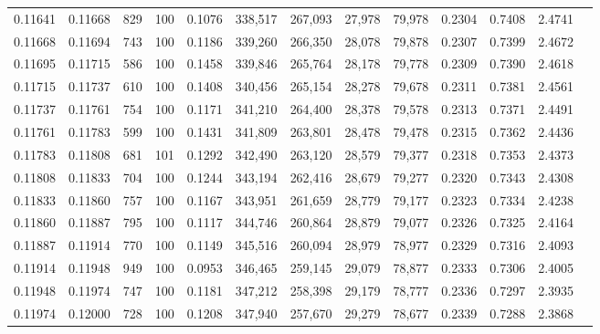 \begin{tabular}{rrrrrrrrrrrrr}
0.11641 & 0.11668 &   829 & 100 &                                     0.1076 & 338,517 & 267,093 &  27,978 &  79,978 & 0.2304 & 0.7408 & 2.4741 \\
0.11668 & 0.11694 &   743 & 100 &                                     0.1186 & 339,260 & 266,350 &  28,078 &  79,878 & 0.2307 & 0.7399 & 2.4672 \\
0.11695 & 0.11715 &   586 & 100 &                                     0.1458 & 339,846 & 265,764 &  28,178 &  79,778 & 0.2309 & 0.7390 & 2.4618 \\
0.11715 & 0.11737 &   610 & 100 &                                     0.1408 & 340,456 & 265,154 &  28,278 &  79,678 & 0.2311 & 0.7381 & 2.4561 \\
0.11737 & 0.11761 &   754 & 100 &                                     0.1171 & 341,210 & 264,400 &  28,378 &  79,578 & 0.2313 & 0.7371 & 2.4491 \\
0.11761 & 0.11783 &   599 & 100 &                                     0.1431 & 341,809 & 263,801 &  28,478 &  79,478 & 0.2315 & 0.7362 & 2.4436 \\
0.11783 & 0.11808 &   681 & 101 &                                     0.1292 & 342,490 & 263,120 &  28,579 &  79,377 & 0.2318 & 0.7353 & 2.4373 \\
0.11808 & 0.11833 &   704 & 100 &                                     0.1244 & 343,194 & 262,416 &  28,679 &  79,277 & 0.2320 & 0.7343 & 2.4308 \\
0.11833 & 0.11860 &   757 & 100 &                                     0.1167 & 343,951 & 261,659 &  28,779 &  79,177 & 0.2323 & 0.7334 & 2.4238 \\
0.11860 & 0.11887 &   795 & 100 &                                     0.1117 & 344,746 & 260,864 &  28,879 &  79,077 & 0.2326 & 0.7325 & 2.4164 \\
0.11887 & 0.11914 &   770 & 100 &                                     0.1149 & 345,516 & 260,094 &  28,979 &  78,977 & 0.2329 & 0.7316 & 2.4093 \\
0.11914 & 0.11948 &   949 & 100 &                                     0.0953 & 346,465 & 259,145 &  29,079 &  78,877 & 0.2333 & 0.7306 & 2.4005 \\
0.11948 & 0.11974 &   747 & 100 &                                     0.1181 & 347,212 & 258,398 &  29,179 &  78,777 & 0.2336 & 0.7297 & 2.3935 \\
0.11974 & 0.12000 &   728 & 100 &                                     0.1208 & 347,940 & 257,670 &  29,279 &  78,677 & 0.2339 & 0.7288 & 2.3868 \\

\end{tabular}
